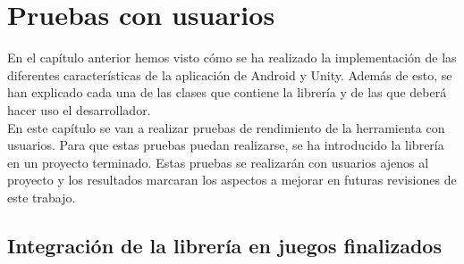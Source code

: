%
%
%
%
%
%
%
%
%
%

\chapter{Pruebas con usuarios}
\label{cap5}
\label{cap:pruebas}

En el cap\'itulo anterior hemos visto c\'omo se ha realizado la implementaci\'on de las diferentes caracter\'isticas de la aplicaci\'on de Android y Unity. Adem\'as de esto, se han explicado cada una de las clases que contiene la librer\'ia y de las que deber\'a hacer uso el desarrollador.\\
En este cap\'itulo se van a realizar pruebas de rendimiento de la herramienta con usuarios. Para que estas pruebas puedan realizarse, se ha introducido la librer\'ia en un proyecto terminado. Estas pruebas se realizar\'an con usuarios ajenos al proyecto y los resultados marcaran los aspectos a mejorar en futuras revisiones de este trabajo. \\

\section{Integraci\'on de la librer\'ia en juegos finalizados}

